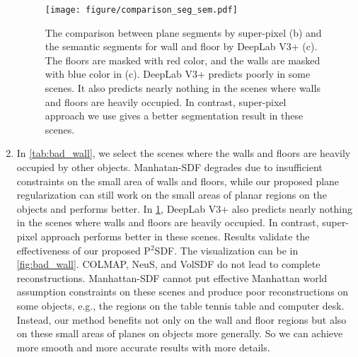\documentclass[10pt,journal,compsoc]{IEEEtran}
\begin{document}
\begin{enumerate}[wide, labelwidth=!, labelindent=0pt]
	\begin{figure}[htbp]
		\centering
		\texttt{[image: figure/comparison\_seg\_sem.pdf]}
		\caption{The comparison between plane segments by super-pixel (b) and the semantic segments for wall and floor by DeepLab V3+ (c). The floors are masked with red color, and the walls are masked with blue color in (c). DeepLab V3+ predicts poorly in some scenes. It also predicts nearly nothing in the scenes where walls and floors are heavily occupied. In contrast, super-pixel approach we use gives a better segmentation result in these scenes.}
		\label{fig:comparison_seg_sem}
	\end{figure}
	\item In \cref{tab:bad_wall}, we select the scenes where the walls and floors are heavily occupied by other objects. Manhatan-SDF degrades due to insufficient constraints on the small area of walls and floors, while our proposed plane regularization can still work on the small areas of planar regions on the objects and performs better. In \cref{fig:comparison_seg_sem}, DeepLab V3+ also predicts nearly nothing in the scenes where walls and floors are heavily occupied. In contrast, super-pixel approach performs better in these scenes. Results validate the effectiveness of our proposed P$^2$SDF. The visualization can be in \cref{fig:bad_wall}. COLMAP, NeuS, and VolSDF do not lead to complete reconstructions. Manhattan-SDF cannot put effective Manhattan world assumption constraints on these scenes and produce poor reconstructions on some objects, e.g., the regions on the table tennis table and computer desk. Instead, our method benefits not only on the wall and floor regions but also on these small areas of planes on objects more generally. So we can achieve more smooth and more accurate results with more details.
\end{enumerate} 
\end{document}
